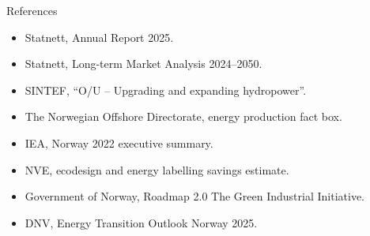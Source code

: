 \documentclass[aspectratio=169]{beamer}
\begin{document}
\begin{frame}{References}
\footnotesize
\begin{itemize}
    \item Statnett, Annual Report 2025.
    \item Statnett, Long-term Market Analysis 2024--2050.
    \item SINTEF, ``O/U -- Upgrading and expanding hydropower''.
    \item The Norwegian Offshore Directorate, energy production fact box.
    \item IEA, Norway 2022 executive summary.
    \item NVE, ecodesign and energy labelling savings estimate.
    \item Government of Norway, Roadmap 2.0 The Green Industrial Initiative.
    \item DNV, Energy Transition Outlook Norway 2025.
\end{itemize}
\end{frame}
\end{document}
